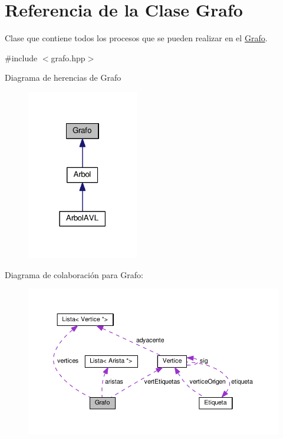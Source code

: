 \hypertarget{classGrafo}{}\section{Referencia de la Clase Grafo}
\label{classGrafo}


Clase que contiene todos los procesos que se pueden realizar en el \hyperlink{classGrafo}{Grafo}.  




{\ttfamily \#include $<$grafo.\+hpp$>$}



Diagrama de herencias de Grafo\nopagebreak
\begin{figure}[H]
\begin{center}
\leavevmode
\includegraphics[width=138pt]{classGrafo__inherit__graph}
\end{center}
\end{figure}


Diagrama de colaboración para Grafo\+:\nopagebreak
\begin{figure}[H]
\begin{center}
\leavevmode
\includegraphics[width=350pt]{classGrafo__coll__graph}
\end{center}
\end{figure}
